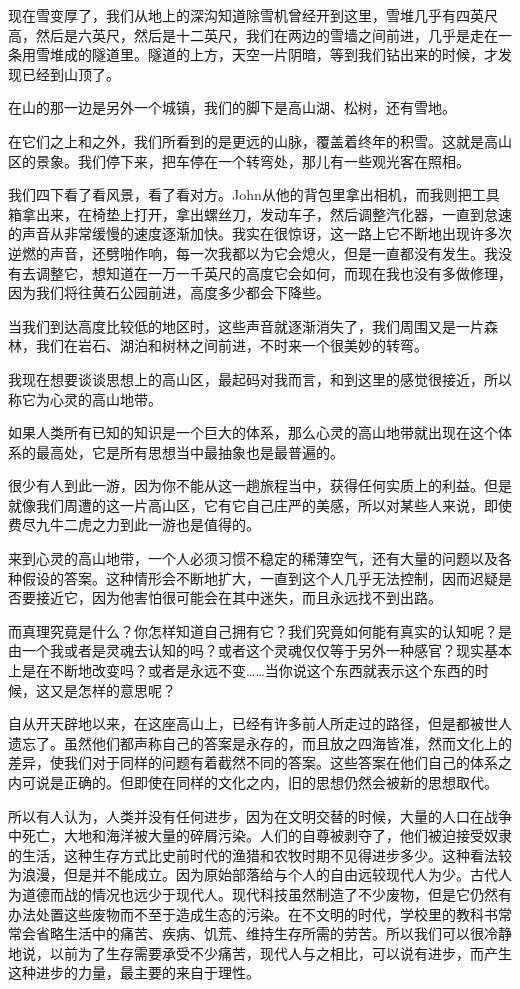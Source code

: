 \documentclass[UTF8]{article}
\begin{document}
\par 现在雪变厚了，我们从地上的深沟知道除雪机曾经开到这里，雪堆几乎有四英尺高，然后是六英尺，然后是十二英尺，我们在两边的雪墙之间前进，几乎是走在一条用雪堆成的隧道里。隧道的上方，天空一片阴暗，等到我们钻出来的时候，才发现已经到山顶了。
\par 在山的那一边是另外一个城镇，我们的脚下是高山湖、松树，还有雪地。
\par 在它们之上和之外，我们所看到的是更远的山脉，覆盖着终年的积雪。这就是高山区的景象。我们停下来，把车停在一个转弯处，那儿有一些观光客在照相。
\par 我们四下看了看风景，看了看对方。John从他的背包里拿出相机，而我则把工具箱拿出来，在椅垫上打开，拿出螺丝刀，发动车子，然后调整汽化器，一直到怠速的声音从非常缓慢的速度逐渐加快。我实在很惊讶，这一路上它不断地出现许多次逆燃的声音，还劈啪作响，每一次我都以为它会熄火，但是一直都没有发生。我没有去调整它，想知道在一万一千英尺的高度它会如何，而现在我也没有多做修理，因为我们将往黄石公园前进，高度多少都会下降些。
\par 当我们到达高度比较低的地区时，这些声音就逐渐消失了，我们周围又是一片森林，我们在岩石、湖泊和树林之间前进，不时来一个很美妙的转弯。
\par 我现在想要谈谈思想上的高山区，最起码对我而言，和到这里的感觉很接近，所以称它为心灵的高山地带。
\par 如果人类所有已知的知识是一个巨大的体系，那么心灵的高山地带就出现在这个体系的最高处，它是所有思想当中最抽象也是最普遍的。
\par 很少有人到此一游，因为你不能从这一趟旅程当中，获得任何实质上的利益。但是就像我们周遭的这一片高山区，它有它自己庄严的美感，所以对某些人来说，即使费尽九牛二虎之力到此一游也是值得的。
\par 来到心灵的高山地带，一个人必须习惯不稳定的稀薄空气，还有大量的问题以及各种假设的答案。这种情形会不断地扩大，一直到这个人几乎无法控制，因而迟疑是否要接近它，因为他害怕很可能会在其中迷失，而且永远找不到出路。
\par 而真理究竟是什么？你怎样知道自己拥有它？我们究竟如何能有真实的认知呢？是由一个我或者是灵魂去认知的吗？或者这个灵魂仅仅等于另外一种感官？现实基本上是在不断地改变吗？或者是永远不变……当你说这个东西就表示这个东西的时候，这又是怎样的意思呢？
\par 自从开天辟地以来，在这座高山上，已经有许多前人所走过的路径，但是都被世人遗忘了。虽然他们都声称自己的答案是永存的，而且放之四海皆准，然而文化上的差异，使我们对于同样的问题有着截然不同的答案。这些答案在他们自己的体系之内可说是正确的。但即使在同样的文化之内，旧的思想仍然会被新的思想取代。
\par 所以有人认为，人类并没有任何进步，因为在文明交替的时候，大量的人口在战争中死亡，大地和海洋被大量的碎屑污染。人们的自尊被剥夺了，他们被迫接受奴隶的生活，这种生存方式比史前时代的渔猎和农牧时期不见得进步多少。这种看法较为浪漫，但是并不能成立。因为原始部落给与个人的自由远较现代人为少。古代人为道德而战的情况也远少于现代人。现代科技虽然制造了不少废物，但是它仍然有办法处置这些废物而不至于造成生态的污染。在不文明的时代，学校里的教科书常常会省略生活中的痛苦、疾病、饥荒、维持生存所需的劳苦。所以我们可以很冷静地说，以前为了生存需要承受不少痛苦，现代人与之相比，可以说有进步，而产生这种进步的力量，最主要的来自于理性。
\end{document}
